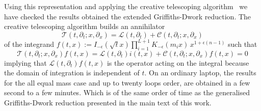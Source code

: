 \documentclass[a4paper,12pt]{article}
\numberwithin{equation}{section}
\numberwithin{figure}{section}
\begin{document}
Using this representation and applying the creative telescoping
algorithm~\cite{Chyzak,Chyzak2,bostan2013creative,Koutchan} we have checked the results obtained the
extended Griffiths-Dwork reduction.
The creative telescoping algorithm builds an annihilator
\begin{equation}
  \mathscr{T}(t,\partial_t; x,\partial_x)= \mathscr{L}(t,\partial_t)+ \mathscr{C}(  t,\partial_t; x,\partial_x)
\end{equation}
of the integrand
$f(t,x):= I_{-\epsilon}(\sqrt{t} x)
  \prod_{i=1}^{L+1}K_{-\epsilon}(m_ix)\,  x^{1+\epsilon(n-1)}$
such that
\begin{equation}
      \mathscr{T}(t,\partial_t; x,\partial_x) f(t,x)=\mathscr{L}(t,\partial_t)i(t,x)+ \mathscr{C}(  t,\partial_t; x,\partial_x) f(t,x)=0
    \end{equation}
    implying that $\mathscr{L}(t,\partial_t)f(t,x)$ is the operator acting
    on the integral because the domain of integration is independent
    of $t$.
On an ordinary laptop, the results for the all equal mass case and up to twenty loops order, are obtained in
a few second to a few minutes. Which is of the same order of time as
the generalised Griffiths-Dwork reduction presented in the main text
of this work.
    
\end{document}
